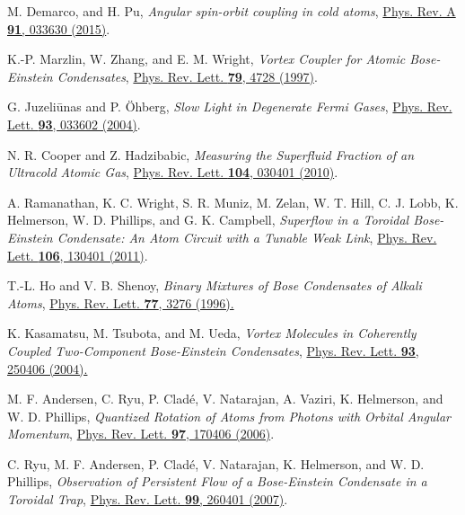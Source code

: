 \documentclass[twocolumn,pra,unsortedaddress,showpacs,floatfix,citeautoscript,nofootinbib]{revtex4-1}
\begin{document}
\begin{thebibliography}{99}
 M. Demarco, and H. Pu, \emph{Angular spin-orbit coupling in cold atoms}, \href{http://dx.doi.org/10.1103/PhysRevA.91.033630}{
Phys. Rev. A \textbf{91}, 033630 (2015)}.

 K.-P. Marzlin, W. Zhang, and E. M. Wright, \emph{Vortex Coupler for Atomic Bose-Einstein Condensates}, \href{http://dx.doi.org/10.1103/PhysRevLett.79.4728}
{Phys. Rev. Lett. \textbf{79}, 4728 (1997)}.

 G. Juzeli\={u}nas and P. \"{O}hberg, \emph{Slow Light in Degenerate Fermi Gases}, \href{http://dx.doi.org/10.1103/PhysRevLett.93.033602}
{Phys. Rev. Lett. \textbf{93}, 033602 (2004)}.

 N. R. Cooper and Z. Hadzibabic, \emph{Measuring the Superfluid Fraction of an Ultracold Atomic Gas}, \href{http://dx.doi.org/10.1103/PhysRevLett.104.030401}
{Phys. Rev. Lett. \textbf{104}, 030401 (2010)}.

 A. Ramanathan, K. C. Wright, S. R. Muniz, M. Zelan,
W. T. Hill, C. J. Lobb, K. Helmerson, W. D. Phillips, and G. K. Campbell,
\emph{Superflow in a Toroidal Bose-Einstein Condensate: An Atom Circuit with a Tunable Weak Link},
\href{http://dx.doi.org/10.1103/PhysRevLett.106.130401}{Phys. Rev. Lett.
\textbf{106}, 130401 (2011)}.

 T.-L. Ho and V. B. Shenoy, \emph{Binary Mixtures of Bose Condensates of Alkali Atoms}, \href{http://dx.doi.org/10.1103/PhysRevLett.77.3276}
{Phys. Rev. Lett. \textbf{77}, 3276 (1996).}

 K. Kasamatsu, M. Tsubota, and M. Ueda, \emph{Vortex Molecules in Coherently Coupled Two-Component Bose-Einstein Condensates}, \href{http://dx.doi.org/10.1103/PhysRevLett.93.250406}%
{Phys. Rev. Lett. \textbf{93}, 250406 (2004).}

 M. F. Andersen, C. Ryu, P. Clad\'{e}, V. Natarajan,
A. Vaziri, K. Helmerson, and W. D. Phillips, \emph{Quantized
Rotation of Atoms from Photons with Orbital Angular Momentum},
\href{http://dx.doi.org/10.1103/PhysRevLett.97.170406} {Phys. Rev.
Lett. \textbf{97}, 170406 (2006)}.

 C. Ryu, M. F. Andersen, P. Clad\'{e}, V. Natarajan, K.
Helmerson, and W. D. Phillips, \emph{Observation of Persistent
Flow of a Bose-Einstein Condensate in a Toroidal Trap},
\href{http://dx.doi.org/10.1103/PhysRevLett.99.260401} {Phys. Rev.
Lett. \textbf{99}, 260401 (2007)}.


\end{thebibliography}
\end{document}
